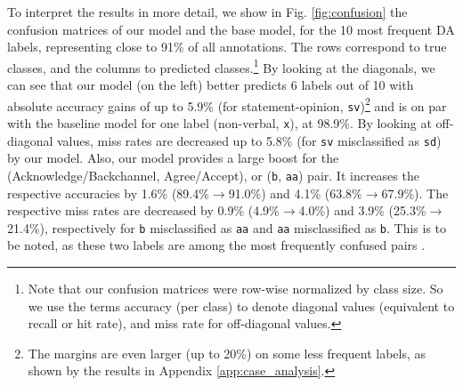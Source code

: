 \documentclass[11pt,a4paper]{article}
\begin{document}
To interpret the results in more detail, we show in Fig. \ref{fig:confusion} the confusion matrices of our model and the base model, for the 10 most frequent DA labels, representing close to 91\% of all annotations.
The rows correspond to true classes, and the columns to predicted classes.\footnote{Note that our confusion matrices were row-wise normalized by class size. So we use the terms accuracy (per class) to denote diagonal values (equivalent to recall or hit rate), and miss rate for off-diagonal values.}
By looking at the diagonals, we can see that our model (on the left) better predicts 6 labels out of 10 with absolute accuracy gains of up to 5.9\% (for statement-opinion, \texttt{sv})\footnote{The margins are even larger (up to 20\%) on some less frequent labels, as shown by the results in Appendix \ref{app:case_analysis}.} and is on par with the baseline model for one label (non-verbal, \texttt{x}), at 98.9\%.
By looking at off-diagonal values, miss rates are decreased up to 5.8\% (for \texttt{sv} misclassified as \texttt{sd}) by our model.
Also, our model provides a large boost for the (Acknowledge/Backchannel, Agree/Accept), or (\texttt{b}, \texttt{aa}) pair.
It increases the respective accuracies by 1.6\% (89.4\%$\rightarrow$91.0\%) and 4.1\% (63.8\%$\rightarrow$67.9\%).
The respective miss rates are decreased by 0.9\% (4.9\%$\rightarrow$4.0\%) and 3.9\% (25.3\%$\rightarrow$21.4\%), respectively for \texttt{b} misclassified as \texttt{aa} and  \texttt{aa} misclassified as \texttt{b}.
This is to be noted, as these two labels are among the most frequently confused pairs \citep{kumar2018dialogue,chen2018dialogue}.
\end{document}
